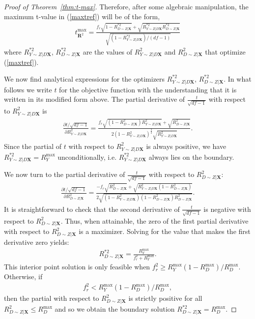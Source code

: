 \documentclass[sts]{imsart}
\theoremstyle{plain}
\theoremstyle{definition}
\newcommand{\df}{df}
\newcommand{\tmax}{t_{\boldsymbol{R}^2}^{\max}}
\newcommand{\Ry}{R^2_{Y\sim Z | D\mathbf{X}}}
\newcommand{\Rd}{R^2_{D\sim Z | \mathbf{X}}}
\newcommand{\Rymax}{R^{\max }_{Y}}
\newcommand{\Rdmax}{R^{\max }_{D}}
\newcommand{\Rystar}{R^{* 2}_{Y\sim Z | D\mathbf{X}}}
\newcommand{\Rdstar}{R^{* 2}_{D\sim Z | \mathbf{X}}}
\begin{document}
\begin{appendix}
\begin{proof}[Proof of Theorem~\ref{thm:t-max}]
    Therefore, after some algebraic manipulation, the maximum t-value in (\ref{maxtref}) will be of the form,
    \begin{align*}
        {\textstyle \tmax
        = \frac{f_{r} \sqrt{1-\Rdstar} + \sqrt{\Rystar\Rdstar}}{\sqrt{(1-\Rystar) / (\df-1)}}}
    \end{align*}
    where $\Rystar$, $\Rdstar$ are the values of $\Ry$ and $\Rd$ that optimize (\ref{maxtref}).
   
    We now find analytical expressions for the optimizers  $\Rystar$, $\Rdstar$.
    In what follows we write $t$  for the objective function with the understanding that it is written in its modified form above. The partial derivative of $\frac{t}{\sqrt{\df-1}}$ with respect to $\Ry$ is
    \begin{align*}
        {\textstyle \frac{\partial t / \sqrt{\df-1}}{\partial \Ry} = \tfrac{f_{r} \sqrt{(1-\Rd)\Ry}+\sqrt{\Rd}}{2(1-\Ry)^{\frac{3}{2}}\sqrt{\Ry}}.}
    \end{align*}
    Since the partial of $t$ with respect to $\Ry$ is always positive, we have $\Rystar = \Rymax$ unconditionally, i.e. $\Rystar$ always lies on the boundary.
    
    We now turn to the partial derivative of $\frac{t}{\sqrt{\df-1}}$ with respect to $\Rd$:
    \begin{align*}
        {\textstyle \frac{\partial t / \sqrt{\df-1}}{\partial \Rd} = \tfrac{-f_{r} \sqrt{\Rd}+\sqrt{\Ry(1-\Rd)}}{2\sqrt{(1-\Ry)(1-\Rd)\Rd}}.}
    \end{align*}
    It is straightforward to check that the second derivative of $\frac{t}{\sqrt{\df-1}}$ is negative with respect to $\Rd$. 
    Thus, when attainable, the zero of the first partial derivative with respect to $\Rd$ is a maximizer. Solving for the value that makes the first derivative zero yields: 
     \begin{align}
         \Rdstar = \frac{\Rymax}{f_{r} ^2 + \Rymax}. \label{xrvi1:d}
     \end{align}
    This interior point solution is only feasible when $f_{r} ^2 \geq \Rymax(1-\Rdmax)/\Rdmax$. Otherwise, if
    \begin{align}
         f_{r} ^2 < \Rymax(1-\Rdmax)/\Rdmax,
         \label{boundcondtn}
    \end{align}
    then the partial with respect to $\Rd$ is  strictly positive for all $\Rd \leq \Rdmax$ and so we obtain the boundary solution $\Rdstar = \Rdmax$.
\end{proof}




\end{appendix}
\end{document}
